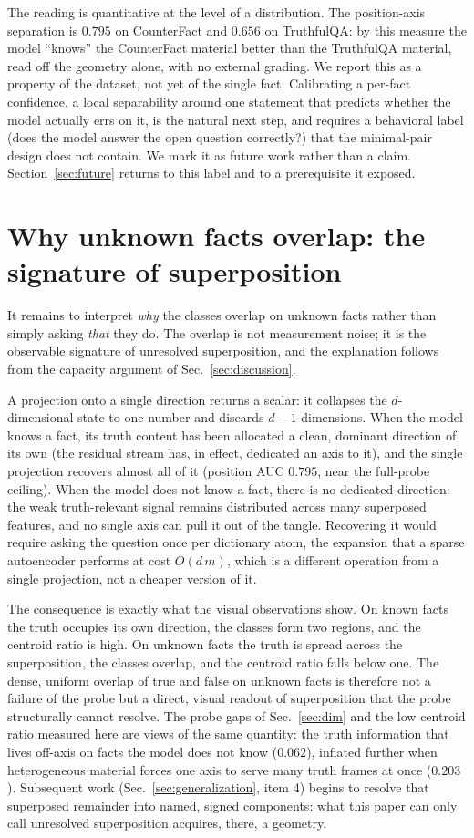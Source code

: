 \documentclass[11pt]{article}
\begin{document}
The reading is quantitative at the level of a distribution. The position-axis
separation is $0.795$ on CounterFact and $0.656$ on TruthfulQA: by this
measure the model ``knows'' the CounterFact material better than the
TruthfulQA material, read off the geometry alone, with no external grading.
We report this as a property of the dataset, not yet of the single fact.
Calibrating a per-fact confidence, a local separability around one statement
that predicts whether the model actually errs on it, is the natural next
step, and requires a behavioral label (does the model answer the open
question correctly?) that the minimal-pair design does not contain. We mark
it as future work rather than a claim. Section~\ref{sec:future} returns to
this label and to a prerequisite it exposed.

\section{Why unknown facts overlap: the signature of superposition}
\label{sec:why}

It remains to interpret \emph{why} the classes overlap on unknown facts
rather than simply asking \emph{that} they do. The overlap is not measurement
noise; it is the observable signature of unresolved superposition, and the
explanation follows from the capacity argument of Sec.~\ref{sec:discussion}.

A projection onto a single direction returns a scalar: it collapses the
$d$-dimensional state to one number and discards $d - 1$ dimensions. When the
model knows a fact, its truth content has been allocated a clean, dominant
direction of its own (the residual stream has, in effect, dedicated an axis
to it), and the single projection recovers almost all of it (position AUC
$0.795$, near the full-probe ceiling). When the model does not know a fact,
there is no dedicated direction: the weak truth-relevant signal remains
distributed across many superposed features, and no single axis can pull it
out of the tangle. Recovering it would require asking the question once per
dictionary atom, the expansion that a sparse autoencoder performs at cost
$O(d\,m)$, which is a different operation from a single projection, not a
cheaper version of it.

The consequence is exactly what the visual observations show. On known facts
the truth occupies its own direction, the classes form two regions, and the
centroid ratio is high. On unknown facts the truth is spread across the
superposition, the classes overlap, and the centroid ratio falls below one.
The dense, uniform overlap of true and false on unknown facts is therefore
not a failure of the probe but a direct, visual readout of superposition that
the probe structurally cannot resolve. The probe gaps of
Sec.~\ref{sec:dim} and the low centroid ratio measured here are views of the
same quantity: the truth information that lives off-axis on facts the model
does not know ($0.062$), inflated further when heterogeneous material forces
one axis to serve many truth frames at once ($0.203$). Subsequent work
(Sec.~\ref{sec:generalization}, item 4) begins to resolve that superposed
remainder into named, signed components: what this paper can only call
unresolved superposition acquires, there, a geometry.
\end{document}
